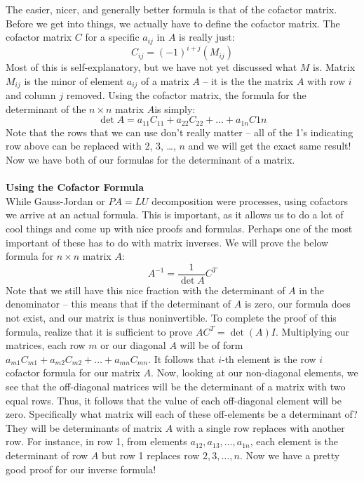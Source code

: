 \documentclass[12pt]{amsart}
\begin{document}
The easier, nicer, and generally better formula is that of the cofactor matrix. Before we get into things, we actually have to define the cofactor matrix. The cofactor matrix $C$ for a specific $a_{ij}$ in $A$ is really just:
\[C_{ij} = (-1)^{i+j}(M_{ij})\]
Most of this is self-explanatory, but we have not yet discussed what $M$ is. Matrix $M_{ij}$ is the minor of element $a_{ij}$ of a matrix $A$ -- it is the the matrix $A$ with row $i$ and column $j$ removed. Using the cofactor matrix, the formula for the determinant of the $n \times n$ matrix $A$is simply:
\[\det A = a_{11}C_{11} + a_{22}C_{22} + \dots + a_{1n}C{1n}\]
Note that the rows that we can use don't really matter -- all of the 1's indicating row above can be replaced with 2, 3, \dots, $n$ and we will get the exact same result! Now we have both of our formulas for the determinant of a matrix.\\ \\
\textbf{Using the Cofactor Formula}\\
While Gauss-Jordan or $PA=LU$ decomposition were processes, using cofactors we arrive at an actual formula. This is important, as it allows us to do a lot of cool things and come up with nice proofs and formulas. Perhaps one of the most important of these has to do with matrix inverses. We will prove the below formula for $n \times n$ matrix $A$:
\[A^{-1} = \frac{1}{\det A}C^T\]
Note that we still have this nice fraction with the determinant of $A$ in the denominator -- this means that if the determinant of $A$ is zero, our formula does not exist, and our matrix is thus noninvertible. To complete the proof of this formula, realize that it is sufficient to prove $A C^T = \det(A)I$. Multiplying our matrices, each row $m$ or our diagonal $A$ will be of form $a_{m1}C_{m1} + a_{m2}C_{m2} + \dots + a_{mn}C_{mn}$. It follows that $i$-th element is the row $i$ cofactor formula for our matrix $A$. Now, looking at our non-diagonal elements, we see that the off-diagonal matrices will be the determinant of a matrix with two equal rows. Thus, it follows that the value of each off-diagonal element will be zero. Specifically what matrix will each of these off-elements be a determinant of? They will be determinants of matrix $A$ with a single row replaces with another row. For instance, in row 1, from elements $a_{12}, a_{13}, \dots, a_{1n}$, each element is the determinant of row $A$ but row 1 replaces row $2, 3, \dots , n$. Now we have a pretty good proof for our inverse formula!\\ \\
\end{document}
